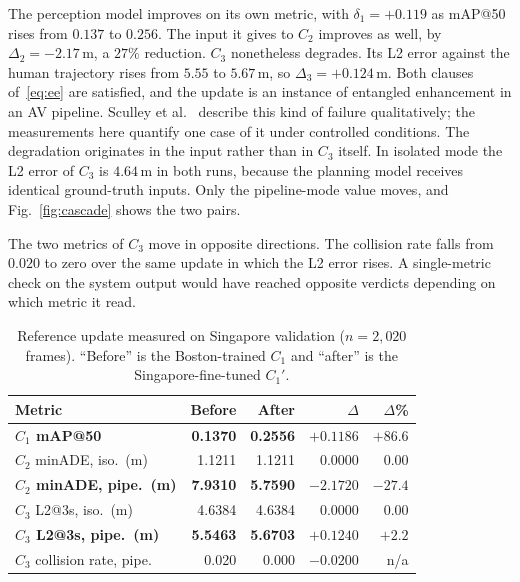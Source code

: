 \documentclass[conference]{IEEEtran}
\begin{document}
The perception model improves on its own metric, with $\delta_1 = +0.119$ as mAP@50 rises
from $0.137$ to $0.256$. The input it gives to $C_2$ improves as well, by
$\Delta_2 = -2.17$\,m, a $27\%$ reduction. $C_3$ nonetheless degrades. Its
L2 error against the human trajectory rises from $5.55$ to $5.67$\,m, so
$\Delta_3 = +0.124$\,m. Both clauses of~\eqref{eq:ee} are satisfied, and
the update is an instance of entangled enhancement in an AV pipeline. Sculley et
al.~\cite{sculley2015hidden} describe this kind of failure qualitatively; the
measurements here quantify one case of it under controlled conditions. The
degradation originates in the input rather than in $C_3$ itself. In
isolated mode the L2 error of $C_3$ is $4.64$\,m in both runs, because the
planning model receives identical ground-truth inputs. Only the pipeline-mode value
moves, and Fig.~\ref{fig:cascade} shows the two pairs.

The two metrics of $C_3$ move in opposite directions. The collision rate falls
from $0.020$ to zero over the same update in which the L2 error rises. A
single-metric check on the system output would have reached opposite
verdicts depending on which metric it read.

\begin{table}[htbp]
\caption{Reference update measured on Singapore validation ($n=2{,}020$ frames).
``Before'' is the Boston-trained $C_1$ and ``after'' is the Singapore-fine-tuned
$C_1'$.}
\label{tab:results}
\centering
\renewcommand{\arraystretch}{1.2}
\setlength{\tabcolsep}{4pt}
\begin{tabular}{@{}lrrrr@{}}
\toprule
\textbf{Metric} & \textbf{Before} & \textbf{After} & \textbf{$\Delta$} & \textbf{$\Delta$\%} \\
\midrule
\textbf{$C_1$ mAP@50}       & \textbf{0.1370}  & \textbf{0.2556} & $\mathbf{+0.1186}$  & $\mathbf{+86.6}$ \\
$C_2$ minADE, iso.\ (m)      & 1.1211  & 1.1211 & $0.0000$   & $0.00$   \\
\textbf{$C_2$ minADE, pipe.\ (m)} & \textbf{7.9310} & \textbf{5.7590} & $\mathbf{-2.1720}$ & $\mathbf{-27.4}$ \\
$C_3$ L2@3s, iso.\ (m)       & 4.6384  & 4.6384 & $0.0000$   & $0.00$   \\
\textbf{$C_3$ L2@3s, pipe.\ (m)} & \textbf{5.5463} & \textbf{5.6703} & $\mathbf{+0.1240}$ & $\mathbf{+2.2}$ \\
$C_3$ collision rate, pipe. & 0.020   & 0.000  & $-0.0200$   & n/a \\
\bottomrule
\end{tabular}
\end{table}
\end{document}
